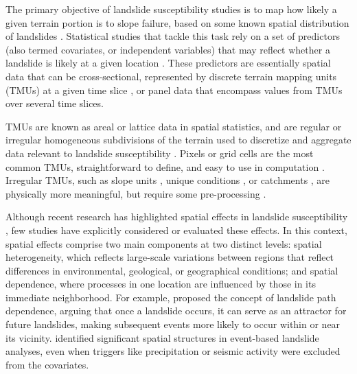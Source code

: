 \documentclass[journal abbreviation, manuscript]{copernicus}
\begin{document}
\introduction 
The primary objective of landslide susceptibility studies is to map how likely a given terrain portion is to slope failure, based on some known spatial distribution of landslides \citep{fell2008guidelines, corominas2014recommendations, soeters1996slope}. Statistical studies that tackle this task rely on a set of predictors (also termed covariates, or independent variables) that may reflect whether a landslide is likely at a given location \citep{reichenbach2018review, steger2019statistical}. These predictors are essentially spatial data that can be cross-sectional, represented by discrete terrain mapping units (TMUs) at a given time slice \citep{elhorst2014spatial}, or panel data that encompass values from TMUs over several time slices.

TMUs are known as areal or lattice data in spatial statistics, and are regular or irregular homogeneous subdivisions of the terrain used to discretize and aggregate data relevant to landslide susceptibility \citep{carrara1995gis, erener2012landslide}. Pixels or grid cells are the most common TMUs, straightforward to define, and easy to use in computation \citep{ba2018comparison}. Irregular TMUs, such as slope units \citep{tanyas2019global, alvioli2016automatic}, unique conditions \citep{clerici2002procedure}, or catchments \citep{von2013rainfall, shou2020evaluation}, are physically more meaningful, but require some pre-processing \citep{caleca2025pan}.

Although recent research has highlighted spatial effects in landslide susceptibility \citep{lombardo2019geostatistical}, few studies have explicitly considered or evaluated these effects. In this context, spatial effects comprise two main components at two distinct levels: spatial heterogeneity, which reflects large-scale variations between regions that reflect differences in environmental, geological, or geographical conditions; and spatial dependence, where processes in one location are influenced by those in its immediate neighborhood. For example, \citet{samia2019dynamic} proposed the concept of landslide path dependence, arguing that once a landslide occurs, it can serve as an attractor for future landslides, making subsequent events more likely to occur within or near its vicinity. \citet{lombardo2019geostatistical} identified significant spatial structures in event-based landslide analyses, even when triggers like precipitation or seismic activity were excluded from the covariates.
\end{document}
